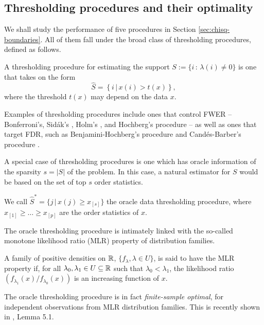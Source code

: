 \subsection{Thresholding procedures and their optimality}

We shall study the performance of five procedures in Section \ref{sec:chisq-boundaries}.
All of them fall under the broad class of thresholding procedures, defined as follows.
\begin{definition}
A thresholding procedure for estimating the support 
$S:=\{i\, :\, \lambda(i)\neq0\}$ is one that takes on the form
\begin{equation} \label{eq:thresholding-procedure}
    \widehat{S} = \left\{i\,|\,x(i) > t(x)\right\},
\end{equation}
where the threshold $t(x)$ may depend on the data $x$.
\end{definition}
Examples of thresholding procedures include ones that control FWER -- Bonferroni's, Sid\'ak's \citep{vsidak1967rectangular}, Holm's \citep{holm1979simple}, and Hochberg's procedure \citep{hochberg1988sharper} -- as well as ones that target FDR, such as Benjamini-Hochberg's procedure \cite{benjamini1995controlling} and Cand\'es-Barber's procedure \cite{barber2015controlling}.

A special case of thresholding procedures is one which has oracle information of the sparsity $s = |S|$ of the problem. 
In this case, a natural estimator for $S$ would be based on the set of top $s$ order statistics.
\begin{definition}
We call $\widehat{S}^* = \{j\,|\, x(j)\ge x_{[s]}\}$ the oracle data thresholding procedure, where $x_{[1]} \ge \ldots \ge x_{[p]}$ are the order statistics of $x$.
\end{definition}
The oracle thresholding procedure is intimately linked with the so-called monotone likelihood ratio (MLR) property of distribution families.
\begin{definition}
A family of positive densities on $\mathbb R$, $\{f_\lambda, \lambda \in U\}$, is said to have the MLR property if, for all $\lambda_0, \lambda_1\in U\subseteq\mathbb R$ such that $\lambda_0 < \lambda_1$, the likelihood ratio $\left(f_{\lambda_1}(x)/f_{\lambda_0}(x)\right)$ is an increasing function of $x$.
\end{definition}
The oracle thresholding procedure is in fact \emph{finite-sample optimal}, for independent observations from MLR distribution families. 
This is recently shown in \cite{gao2018fundamental}, Lemma 5.1.

